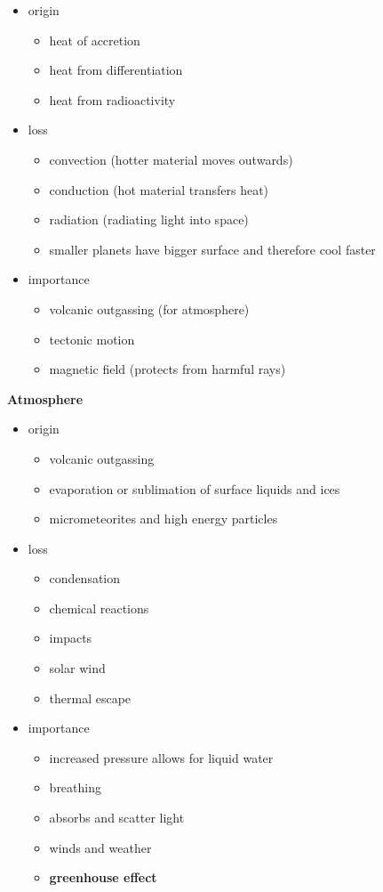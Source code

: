 \documentclass{article}
\theoremstyle{sltheorem}
\begin{document}
\begin{itemize}
	\item origin
	      \begin{itemize}
		      \item heat of accretion
		      \item heat from differentiation
		      \item heat from radioactivity
	      \end{itemize}
	\item loss
	      \begin{itemize}
		      \item convection (hotter material moves outwards)
		      \item conduction (hot material transfers heat)
		      \item radiation (radiating light into space)
		      \item smaller planets have bigger surface and therefore cool faster
	      \end{itemize}
	\item importance
	      \begin{itemize}
		      \item volcanic outgassing (for atmosphere)
		      \item tectonic motion
		      \item magnetic field (protects from harmful rays)
	      \end{itemize}
\end{itemize}
\textbf{Atmosphere}
\begin{itemize}
	\item origin
	      \begin{itemize}
		      \item volcanic outgassing
		      \item evaporation or sublimation of surface liquids and ices
		      \item micrometeorites and high energy particles
	      \end{itemize}
	\item loss
	      \begin{itemize}
		      \item condensation
		      \item chemical reactions
		      \item impacts
		      \item solar wind
		      \item thermal escape
	      \end{itemize}
	\item importance
	      \begin{itemize}
		      \item increased pressure allows for liquid water
		      \item breathing
		      \item absorbs and scatter light
		      \item winds and weather
		      \item \textbf{greenhouse effect}
	      \end{itemize}
\end{itemize}
\end{document}

